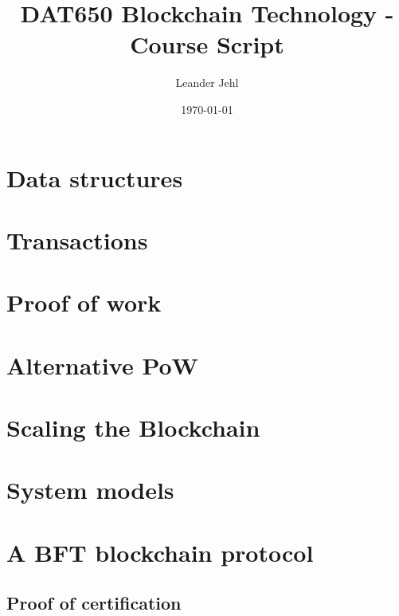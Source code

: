 \documentclass[a4paper,11pt]{report}
\begin{document}
	\title{DAT650 Blockchain Technology - Course Script}
	\author{Leander Jehl}
	\date{\today}
	
	\maketitle
	
	\tableofcontents

\chapter{Data structures}
\label{ch:hashchain}







\chapter{Transactions}
\label{ch:transactions}


\chapter{Proof of work}



\chapter{Alternative PoW}


\chapter{Scaling the Blockchain}
\label{ch:scaling}


\chapter{System models}


\chapter{A BFT blockchain protocol}
	\label{ch:BFT}
	\section{Proof of certification}
	\label{sec:poc}
	
	
\end{document}
